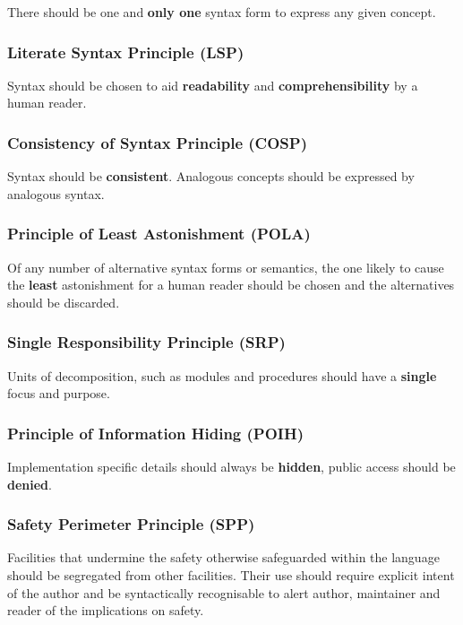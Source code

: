 \documentclass[10pt,a4paper]{article} %
\begin{document}
There should be one and \textbf{only one} syntax form to express any given concept.

\subsubsection{Literate Syntax Principle (LSP)}

Syntax should be chosen to aid \textbf{readability} and \textbf{comprehensibility} by a human reader.

\subsubsection{Consistency of Syntax Principle (COSP)}

Syntax should be \textbf{consistent}. Analogous concepts should be expressed by analogous syntax.

\subsubsection{Principle of Least Astonishment (POLA)}

Of any number of alternative syntax forms or semantics, the one likely to cause the \textbf{least} astonishment for a human reader should be chosen and the alternatives should be discarded.

\subsubsection{Single Responsibility Principle (SRP)}

Units of decomposition, such as modules and procedures should have a \textbf{single} focus and purpose.

\subsubsection{Principle of Information Hiding (POIH)}

Implementation specific details should always be \textbf{hidden}, public access should be \textbf{denied}.

\subsubsection{Safety Perimeter Principle (SPP)}

Facilities that undermine the safety otherwise safeguarded within the language should be segregated from other facilities. Their use should require explicit intent of the author and be syntactically recognisable to alert author, maintainer and reader of the implications on safety.
\end{document}
